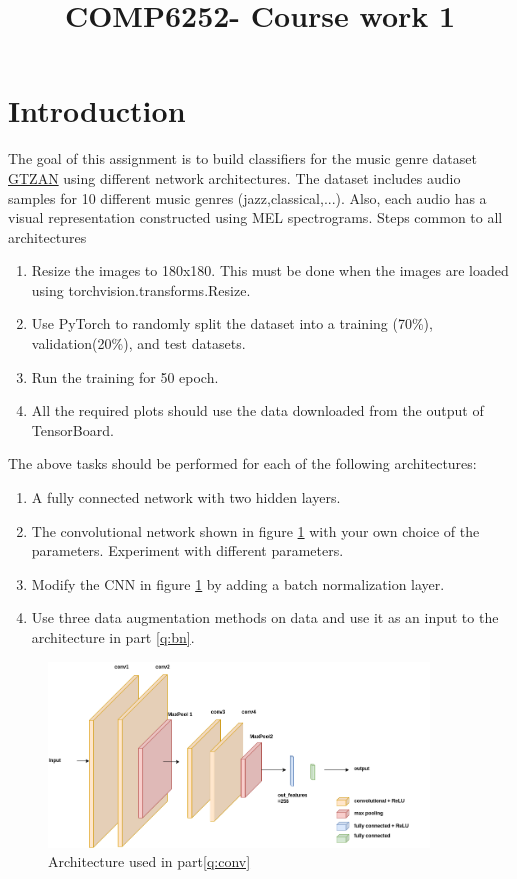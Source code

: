 \documentclass{article}
\title{COMP6252- Course work 1}
\begin{document}
\maketitle
\section{Introduction}
The goal of this assignment is to build classifiers for the music genre dataset \href{https://www.kaggle.com/datasets/andradaolteanu/gtzan-dataset-music-genre-classification}{GTZAN} using different network architectures.
The dataset includes audio samples for 10 different music genres (jazz,classical,...). Also, each audio has a visual representation constructed using MEL spectrograms.
Steps common to all architectures
\begin{enumerate}
    \item Resize the images to 180x180. This must be done when the images are loaded using torchvision.transforms.Resize. 
    \item Use PyTorch to randomly split the dataset into a training (70\%), validation(20\%), and test datasets.
    \item Run the training for 50 epoch.
    \item All the required plots should use the data downloaded from the output of TensorBoard.
  
\end{enumerate}
The above tasks should be performed for each of the following architectures:
\begin{enumerate}[label=\Alph*]
    \item A fully connected network with two hidden layers\label{q:fc}.
    \item\label{q:conv} The convolutional network shown in figure \ref{fig:conv} with your own choice of the parameters. Experiment with different parameters.
    \item Modify the CNN in figure \ref{fig:conv} by adding a batch normalization layer\label{q:bn}.
    \item Use three data augmentation methods on data and use it as an input to the architecture in part \ref{q:bn}\label{q:da}.
    
\end{enumerate} 
\begin{figure}[h]
    \begin{center}
        \includegraphics[width=0.9\textwidth]{course-work-conv.png}
    \end{center}
    \caption{Architecture used in part\ref{q:conv}\label{fig:conv}    }
\end{figure}
\end{document}
